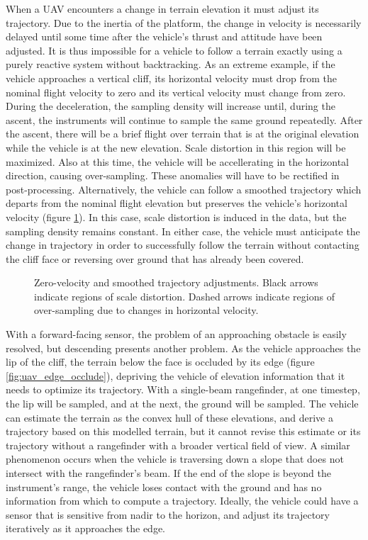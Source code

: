 \documentclass[10pt,a4paper]{report}
\begin{document}
When a UAV encounters a change in terrain elevation it must adjust its trajectory. Due to the inertia of the platform, the change in velocity is  necessarily delayed until some time after the vehicle's thrust and attitude have been adjusted. It is thus impossible for a vehicle to follow a terrain exactly using a purely reactive system without backtracking. As an extreme example, if the vehicle approaches a vertical cliff, its horizontal velocity must drop from the nominal flight velocity to zero and its vertical velocity must change from zero. During the deceleration, the sampling density will increase until, during the ascent, the instruments will continue to sample the same ground repeatedly. After the ascent, there will be a brief flight over terrain that is at the original elevation while the vehicle is at the new elevation. Scale distortion in this region will be maximized. Also at this time, the vehicle will be accellerating in the horizontal direction, causing over-sampling. These anomalies will have to be rectified in post-processing. Alternatively, the vehicle can follow a smoothed trajectory which departs from the nominal flight elevation but preserves the vehicle's horizontal velocity (figure \ref{fig:uav_smooth_traj}). In this case, scale distortion is induced in the data, but the sampling density remains constant. In either case, the vehicle must anticipate the change in trajectory in order to successfully follow the terrain without contacting the cliff face or reversing over ground that has already been covered.

\begin{figure}
\centering
\def\svgscale{0.5}

\caption{Zero-velocity and smoothed trajectory adjustments. Black arrows indicate regions of scale distortion. Dashed arrows indicate regions of over-sampling due to changes in horizontal velocity.}
\label{fig:uav_smooth_traj}
\end{figure}


With a forward-facing sensor, the problem of an approaching obstacle is easily resolved, but descending presents another problem. As the vehicle approaches the lip of the cliff, the terrain below the face is occluded by its edge (figure \ref{fig:uav_edge_occlude}), depriving the vehicle of elevation information that it needs to optimize its trajectory. With a single-beam rangefinder, at one timestep, the lip will be sampled, and at the next, the ground will be sampled. The vehicle can estimate the terrain as the convex hull of these elevations, and derive a trajectory based on this modelled terrain, but it cannot revise this estimate or its trajectory without a rangefinder with a broader vertical field of view. A similar phenomenon occurs when the vehicle is traversing down a slope that does not intersect with the rangefinder's beam. If the end of the slope is beyond the instrument's range, the vehicle loses contact with the ground and has no information from which to compute a trajectory.  Ideally, the vehicle could have a sensor that is sensitive from nadir to the horizon, and adjust its trajectory iteratively as it approaches the edge. 
\end{document}
